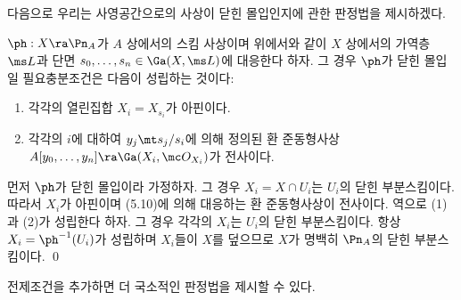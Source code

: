 	다음으로 우리는 사영공간으로의 사상이 닫힌 몰입인지에 관한 판정법을 제시하겠다.
	
	
	\begin{proposition}
	$\ph:X\ra\Pn_A$가 $A$ 상에서의 스킴 사상이며 위에서와 같이 $X$ 상에서의 가역층 $\ms L$과
	단면 $s_0,\ldots,s_n\in\Ga(X,\ms L)$에 대응한다 하자.
	그 경우 $\ph$가 닫힌 몰입일 필요충분조건은 다음이 성립하는 것이다:
	\begin{enumerate}[label=(\arabic*)]
	\item 각각의 열린집합 $X_i=X_{s_i}$가 아핀이다.
	\item 각각의 $i$에 대하여 $y_j\mt s_j/s_i$에 의해 정의된 환 준동형사상 $A[y_0,\ldots,y_n]\ra\Ga(X_i,\mc O_{X_i})$가 전사이다.\\
	\end{enumerate}
	\pf 먼저 $\ph$가 닫힌 몰입이라 가정하자. 그 경우 $X_i=X\cap U_i$는 $U_i$의 닫힌 부분스킴이다.
	따라서 $X_i$가 아핀이며 (5.10)에 의해 대응하는 환 준동형사상이 전사이다.
	역으로 (1)과 (2)가 성립한다 하자. 그 경우 각각의 $X_i$는 $U_i$의 닫힌 부분스킴이다.
	항상 $X_i=\ph^{-1}(U_i)$가 성립하며 $X_i$들이 $X$를 덮으므로 $X$가 명백히 $\Pn_A$의 닫힌 부분스킴이다.
	\qed
	\end{proposition}
	
	전제조건을 추가하면 더 국소적인 판정법을 제시할 수 있다.
	
